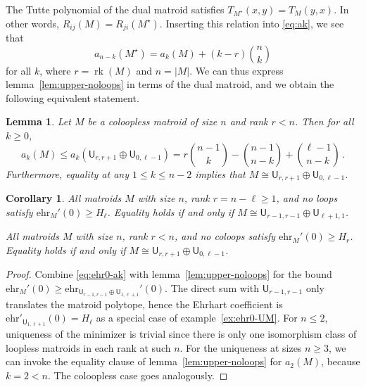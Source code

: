 \documentclass[pagesize,paper=A4,11pt,bibliography=totoc,oneside]{scrartcl}
\newtheorem{lemma}[thm]{Lemma}
\newtheorem{corollary}[thm]{Corollary}
\newcommand{\abs}[1]{\left|#1\right|}
\DeclareMathOperator{\rk}{rk}
\newcommand{\UM}[2]{\mathsf{U}_{#2,#1}} %
\newcommand{\ehr}{\mathrm{ehr}}
\newcommand{\Tutte}{T}
\newcommand{\HN}{H} %
\begin{document}
The Tutte polynomial of the dual matroid satisfies $\Tutte_{M^\star}(x,y)=\Tutte_M(y,x)$. In other words, $R_{ij}(M)=R_{ji}(M^\star)$. Inserting this relation into \eqref{eq:ak}, we see that
\begin{equation*}
    a_{n-k}(M^\star)=a_{k}(M)+(k-r)\binom{n}{k}
\end{equation*}
for all $k$, where $r=\rk(M)$ and $n=\abs{M}$. We can thus express lemma~\ref{lem:upper-noloops} in terms of the dual matroid, and we obtain the following equivalent statement.
\begin{lemma}\label{lem:upper-nocoloops}
    Let $M$ be a coloopless matroid of size $n$ and rank $r<n$. Then for all $k\geq0$,
    \begin{equation*}
        a_k(M)\leq a_k(\UM{r+1}{r}\oplus \UM{\ell-1}{0})
        = r\binom{n-1}{k} -\binom{n-1}{n-k}+ \binom{\ell-1}{n-k}
        \,.
    \end{equation*}
    Furthermore, equality at any $1\leq k\leq n-2$ implies that $M\cong\UM{r+1}{r}\oplus\UM{\ell-1}{0}$.
\end{lemma}
\begin{corollary}\label{cor:ehr0-coloopless}
    All matroids $M$ with size $n$, rank $r=n-\ell\geq 1$, and no loops satisfy $\ehr_M'(0)\geq \HN_{\ell}$. Equality holds if and only if $M\cong \UM{r-1}{r-1}\oplus \UM{1}{\ell+1}$.
    
    All matroids $M$ with size $n$, rank $r<n$, and no coloops satisfy $\ehr_M'(0)\geq \HN_r$. Equality holds if and only if $M\cong \UM{r+1}{r}\oplus\UM{\ell-1}{0}$.
\end{corollary}
\begin{proof}
    Combine \eqref{eq:ehr0-ak} with lemma~\ref{lem:upper-noloops} for the bound $\ehr_M'(0)\geq\ehr_{\UM{r-1}{r-1}\oplus\UM{\ell+1}{1}}'(0)$. The direct sum with $\UM{r-1}{r-1}$ only translates the matroid polytope, hence the Ehrhart coefficient is $\ehr'_{\UM{\ell+1}{1}}(0)=\HN_{\ell}$ as a special case of example~\ref{ex:ehr0-UM}. For $n\leq 2$, uniqueness of the minimizer is trivial since there is only one isomorphism class of loopless matroids in each rank at such $n$. For the uniqueness at sizes $n\geq 3$, we can invoke the equality clause of lemma~\ref{lem:upper-noloops} for $a_2(M)$, because $k=2<n$. The coloopless case goes analogously.
\end{proof}
\end{document}
